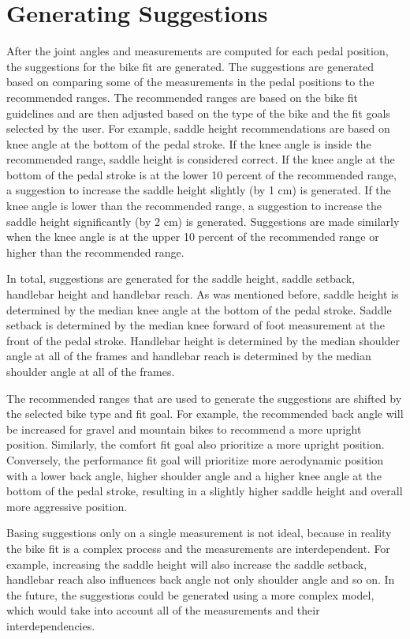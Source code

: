 \section{Generating Suggestions}
\label{generating_suggestions}
After the joint angles and measurements are computed for each pedal position, the suggestions for the bike fit are generated. The suggestions are generated based on comparing some of the measurements in the pedal positions to the recommended ranges. The recommended ranges are based on the bike fit guidelines and are then adjusted based on the type of the bike and the fit goals selected by the user. For example, saddle height recommendations are based on knee angle at the bottom of the pedal stroke. If the knee angle is inside the recommended range, saddle height is considered correct. If the knee angle at the bottom of the pedal stroke is at the lower 10 percent of the recommended range, a suggestion to increase the saddle height slightly (by 1 cm) is generated. If the knee angle is lower than the recommended range, a suggestion to increase the saddle height significantly (by 2 cm) is generated. Suggestions are made similarly when the knee angle is at the upper 10 percent of the recommended range or higher than the recommended range.

In total, suggestions are generated for the saddle height, saddle setback, handlebar height and handlebar reach. As was mentioned before, saddle height is determined by the median knee angle at the bottom of the pedal stroke. Saddle setback is determined by the median knee forward of foot measurement at the front of the pedal stroke. Handlebar height is determined by the median shoulder angle at all of the frames and handlebar reach is determined by the median shoulder angle at all of the frames.

The recommended ranges that are used to generate the suggestions are shifted by the selected bike type and fit goal. For example, the recommended back angle will be increased for gravel and mountain bikes to recommend a more upright position. Similarly, the comfort fit goal also prioritize a more upright position. Conversely, the performance fit goal will prioritize more aerodynamic position with a lower back angle, higher shoulder angle and a higher knee angle at the bottom of the pedal stroke, resulting in a slightly higher saddle height and overall more aggressive position.

Basing suggestions only on a single measurement is not ideal, because in reality the bike fit is a complex process and the measurements are interdependent. For example, increasing the saddle height will also increase the saddle setback, handlebar reach also influences back angle not only shoulder angle and so on. In the future, the suggestions could be generated using a more complex model, which would take into account all of the measurements and their interdependencies.
